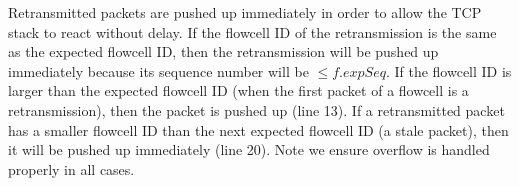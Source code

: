  Retransmitted packets are 
pushed up immediately in order to allow the TCP stack to react without delay. 
If the flowcell ID of the retransmission is the same as the expected flowcell ID, then 
the retransmission will be pushed up immediately because its sequence number will be $\leq f.expSeq$. 
If the flowcell ID is larger
than the expected flowcell ID (when the first packet of a flowcell is a retransmission), then the packet is pushed up (line 13). 
If a retransmitted packet has a smaller flowcell ID than the next expected flowcell ID (a stale packet),
then it will be pushed up immediately (line 20). 
Note we ensure overflow is handled properly in all cases.




